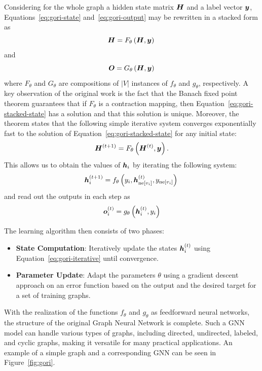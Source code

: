 Considering for the whole graph a hidden state matrix \( \bm{H} \) and a label vector \( \bm{y} \), Equations~\ref{eq:gori-state} and~\ref{eq:gori-output} may be rewritten in a stacked form as
\begin{equation}\label{eq:gori-stacked-state}
	\bm{H} = F_\theta \left( \bm{H}, \bm{y} \right) \\
\end{equation}
and
\begin{equation}\label{eq:gori-stacked-output}
	\bm{O} = G_\theta \left( \bm{H}, \bm{y} \right)
\end{equation}
where \( F_\theta \) and \( G_\theta \) are compositions of \( \left\lvert V \right\rvert \) instances of \( f_\theta \) and \( g_\theta \), respectively. A key observation of the original work is the fact that the Banach fixed point theorem guarantees that if \( F_\theta \) is a contraction mapping, then Equation~\ref{eq:gori-stacked-state} has a solution and that this solution is unique. Moreover, the theorem states that the following simple iterative system converges exponentially fast to the solution of Equation~\ref{eq:gori-stacked-state} for any initial state:
\begin{equation}
	\bm{H}^{(t+1)} = F_\theta \left( \bm{H}^{(t)}, \bm{y} \right).
\end{equation}
This allows us to obtain the values of \( \bm{h}_i \) by iterating the following system:
\begin{equation}\label{eq:gori-iterative}
	\bm{h}_i^{(t+1)} = f_\theta \left( y_i, \bm{h}_{\mathrm{ne}[v_i]}^{(t)}, y_{\mathrm{ne}[v_i]} \right) \\
\end{equation}
and read out the outputs in each step as
\begin{equation}
	\bm{o}_i^{(t)} = g_\theta \left( \bm{h}_i^{(t)}, y_i \right)
\end{equation}

The learning algorithm then consists of two phases:
\begin{itemize}
	\item \textbf{State Computation}: Iteratively update the states \( \bm{h}_i^{(t)} \) using Equation~\ref{eq:gori-iterative} until convergence.
	\item \textbf{Parameter Update}: Adapt the parameters \( \theta \) using a gradient descent approach on an error function based on the output and the desired target for a set of training graphs.
\end{itemize}
With the realization of the functions \( f_\theta \) and \( g_\theta \) as feedforward neural networks, the structure of the original Graph Neural Network is complete. Such a GNN model can handle various types of graphs, including directed, undirected, labeled, and cyclic graphs, making it versatile for many practical applications. An example of a simple graph and a corresponding GNN can be seen in Figure~\ref{fig:gori}.


